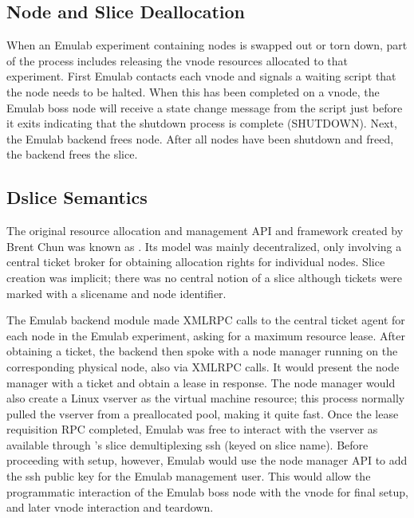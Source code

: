 \subsection{Node and Slice Deallocation}

When an Emulab experiment containing \plab nodes is swapped out or
torn down, part of the process includes releasing the \plab vnode
resources allocated to that experiment.  First Emulab contacts each
vnode and signals a waiting script that the node needs to be halted.
When this has been completed on a vnode, the Emulab boss node will
receive a state change message from the script just before it exits
indicating that the shutdown process is complete (SHUTDOWN).  Next,
the Emulab \plab backend frees \plab node.  After all nodes have been
shutdown and freed, the backend frees the slice.

\subsection{Dslice Semantics}

The original \plab resource allocation and management API and
framework created by Brent Chun was known as \dslice.  Its model was
mainly decentralized, only involving a central ticket broker for
obtaining allocation rights for individual nodes.  Slice creation was
implicit; there was no central notion of a slice although tickets were
marked with a slicename and node identifier.

The Emulab \dslice \plab backend module made XMLRPC calls to the
central \dslice ticket agent for each \plab node in the Emulab
experiment, asking for a maximum resource lease.  After obtaining a
ticket, the \dslice backend then spoke with a node manager running on
the corresponding physical \plab node, also via XMLRPC calls.  It
would present the node manager with a ticket and obtain a lease in
response.  The node manager would also create a Linux vserver as the
virtual machine resource; this process normally pulled the vserver
from a preallocated pool, making it quite fast.  Once the lease
requisition RPC completed, Emulab was free to interact with the
vserver as available through \plab's slice demultiplexing ssh (keyed
on slice name).  Before proceeding with setup, however, Emulab would
use the \dslice node manager API to add the ssh public key for the
Emulab management user.  This would allow the programmatic interaction
of the Emulab boss node with the \plab vnode for final setup, and
later vnode interaction and teardown.

